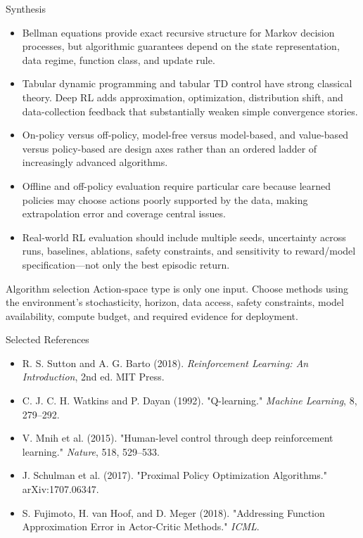 \documentclass[aspectratio=169]{beamer}
\begin{document}
\begin{frame}{Synthesis}
  \begin{itemize}
    \item Bellman equations provide exact recursive structure for Markov decision processes, but algorithmic guarantees depend on the state representation, data regime, function class, and update rule.
    \item Tabular dynamic programming and tabular TD control have strong classical theory. Deep RL adds approximation, optimization, distribution shift, and data-collection feedback that substantially weaken simple convergence stories.
    \item On-policy versus off-policy, model-free versus model-based, and value-based versus policy-based are design axes rather than an ordered ladder of increasingly advanced algorithms.
    \item Offline and off-policy evaluation require particular care because learned policies may choose actions poorly supported by the data, making extrapolation error and coverage central issues.
    \item Real-world RL evaluation should include multiple seeds, uncertainty across runs, baselines, ablations, safety constraints, and sensitivity to reward/model specification—not only the best episodic return.
  \end{itemize}

  \begin{alertbox}{Algorithm selection}
    Action-space type is only one input. Choose methods using the environment's stochasticity, horizon, data access, safety constraints, model availability, compute budget, and required evidence for deployment.
  \end{alertbox}
\end{frame}

\begin{frame}{Selected References}
  \small
  \begin{itemize}
    \item R. S. Sutton and A. G. Barto (2018). \textit{Reinforcement Learning: An Introduction}, 2nd ed. MIT Press.
    \item C. J. C. H. Watkins and P. Dayan (1992). "Q-learning." \textit{Machine Learning}, 8, 279--292.
    \item V. Mnih et al. (2015). "Human-level control through deep reinforcement learning." \textit{Nature}, 518, 529--533.
    \item J. Schulman et al. (2017). "Proximal Policy Optimization Algorithms." arXiv:1707.06347.
    \item S. Fujimoto, H. van Hoof, and D. Meger (2018). "Addressing Function Approximation Error in Actor-Critic Methods." \textit{ICML}.
  \end{itemize}
\end{frame}

\contactslide
\end{document}
